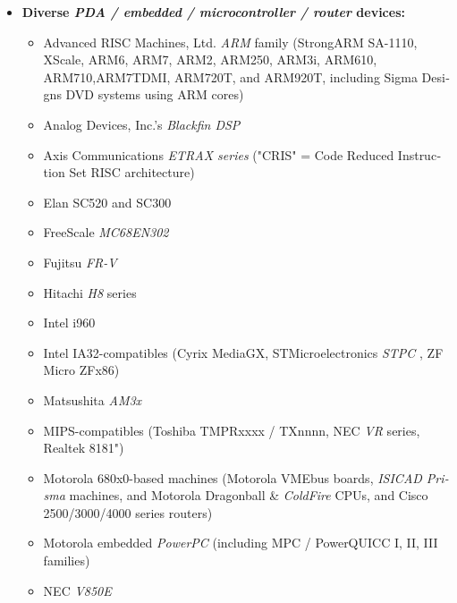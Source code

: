 \documentclass{HOWTO}
\begin{document}
\begin{latin}
\begin{itemize}
	\item {\bfseries Diverse \emph{PDA / embedded / microcontroller / router}  devices:} 
	\begin{itemize}
		\item Advanced RISC Machines, Ltd. \emph{ARM}  family (StrongARM SA-1110, XScale, ARM6, ARM7, ARM2, ARM250, ARM3i, ARM610, ARM710,ARM7TDMI, ARM720T, and ARM920T, including Sigma Designs DVD systems using ARM cores)
		\item Analog Devices, Inc.'s \emph{Blackfin DSP} 
		\item Axis Communications \emph{ETRAX series} 
			("CRIS" = Code Reduced Instruction Set RISC architecture)
		\item Elan SC520 and SC300
		\item FreeScale \emph{MC68EN302} 
		\item Fujitsu \emph{FR-V} 
		\item Hitachi \emph{H8}  series
		\item Intel i960
		\item Intel IA32-compatibles (Cyrix MediaGX, STMicroelectronics \emph{STPC} , ZF Micro ZFx86)
		\item Matsushita \emph{AM3x} 
		\item MIPS-compatibles (Toshiba TMPRxxxx / TXnnnn, NEC \emph{VR}  series, Realtek 8181")
		\item Motorola 680x0-based machines (Motorola VMEbus boards, 
			\emph{ISICAD Prisma}  machines, and Motorola Dragonball \& 
			\emph{ColdFire}  CPUs, and Cisco 2500/3000/4000 series routers)
		\item Motorola embedded \emph{PowerPC} 
			(including MPC / PowerQUICC I, II, III families)
		\item NEC \emph{V850E} 

\end{itemize}
\end{itemize}
\end{latin}
\end{document}
